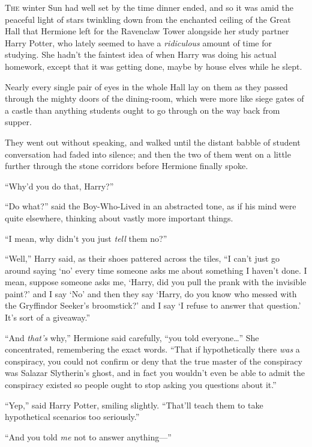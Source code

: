 
\lettrine{T}{he} winter Sun had well set by the time dinner ended, and so it was amid the peaceful light of stars twinkling down from the enchanted ceiling of the Great Hall that Hermione left for the Ravenclaw Tower alongside her study partner Harry Potter, who lately seemed to have a \emph{ridiculous} amount of time for studying. She hadn’t the faintest idea of when Harry was doing his actual homework, except that it was getting done, maybe by house elves while he slept.

Nearly every single pair of eyes in the whole Hall lay on them as they passed through the mighty doors of the dining-room, which were more like siege gates of a castle than anything students ought to go through on the way back from supper.

They went out without speaking, and walked until the distant babble of student conversation had faded into silence; and then the two of them went on a little further through the stone corridors before Hermione finally spoke.

“Why’d you do that, Harry?”

“Do what?” said the Boy-Who-Lived in an abstracted tone, as if his mind were quite elsewhere, thinking about vastly more important things.

“I mean, why didn’t you just \emph{tell} them no?”

“Well,” Harry said, as their shoes pattered across the tiles, “I can’t just go around saying ‘no’ every time someone asks me about something I haven’t done. I mean, suppose someone asks me, ‘Harry, did you pull the prank with the invisible paint?’ and I say ‘No’ and then they say ‘Harry, do you know who messed with the Gryffindor Seeker’s broomstick?’ and I say ‘I refuse to answer that question.’ It’s sort of a giveaway.”

“And \emph{that’s} why,” Hermione said carefully, “you told everyone…” She concentrated, remembering the exact words. “That if hypothetically there \emph{was} a conspiracy, you could not confirm or deny that the true master of the conspiracy was Salazar Slytherin’s ghost, and in fact you wouldn’t even be able to admit the conspiracy existed so people ought to stop asking you questions about it.”

“Yep,” said Harry Potter, smiling slightly. “That’ll teach them to take hypothetical scenarios too seriously.”

“And you told \emph{me} not to answer anything—”

